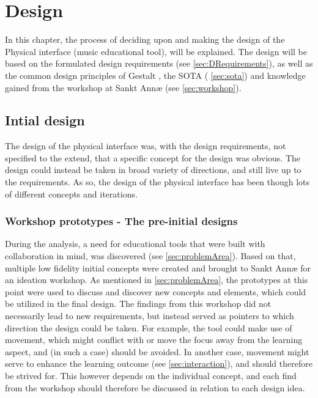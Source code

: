 \chapter{Design}

In this chapter, the process of deciding upon and making the design of the Physical interface (music educational tool), will be explained. The design will be based on the formulated design requirements (see \autoref{sec:DRequirements}), as well as the common design principles of Gestalt \cite{gestalt}, the SOTA ( \autoref{sec:sota}) and knowledge gained from the workshop at Sankt Annæ (see \autoref{sec:workshop}). 


\section{Intial design}
The design of the physical interface was, with the design requirements, not specified to the extend, that a specific concept for the design was obvious. The design could instead be taken in broad variety of directions, and still live up to the requirements. As so, the design of the physical interface has been though lots of different concepts and iterations. 

\subsection {Workshop prototypes - The pre-initial designs}

During the analysis, a need for educational tools that were built with collaboration in mind, was discovered (see \autoref{sec:problemArea}). Based on that, multiple low fidelity initial concepts were created and brought to Sankt Annæ for an ideation workshop. As mentioned in \autoref{sec:problemArea}, the prototypes at this point were used to discuss and discover new concepts and elements, which could be utilized in the final design. The findings from this workshop did not necessarily lead to new requirements, but instead served as pointers to which direction the design could be taken. For example, the tool could make use of movement, which might conflict with or move the focus away from the learning aspect, and (in such a case) should be avoided. In another case, movement might serve to enhance the learning outcome (see \autoref{sec:interaction}), and should therefore be strived for. This however depends on the individual concept, and each find from the workshop should therefore be discussed in relation to each design idea.\\\\

